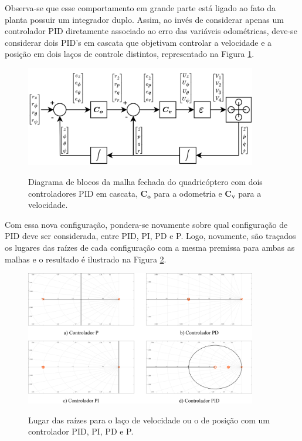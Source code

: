 \documentclass[main.tex]{subfiles}
\begin{document}
Observa-se que esse comportamento em grande parte está ligado ao fato da planta possuir um integrador duplo. Assim, ao invés de considerar apenas um controlador PID diretamente associado ao erro das variáveis odométricas, deve-se considerar dois PID's em cascata que objetivam controlar a velocidade e a posição em dois laços de controle distintos, representado na Figura \ref{fig:controlador_cascata_pid}. 

\begin{figure}[!h]
	\centering
	\caption{Diagrama de blocos da malha fechada do quadricóptero com dois controladores PID em cascata, $\boldsymbol{C_o}$ para a odometria e $\boldsymbol{C_v}$ para a velocidade.}
	\includegraphics[width=0.9\textwidth]{capitulos/controle_atitude/imgs/controlador_cascata_pid.png}
	\label{fig:controlador_cascata_pid}
\end{figure}

Com essa nova configuração, pondera-se novamente sobre qual configuração de PID deve ser considerada, entre PID, PI, PD e P. Logo, novamente, são traçados os lugares das raízes de cada configuração com a mesma premissa para ambas as malhas e o resultado é ilustrado na Figura \ref{fig:lugar_raizes_bom}.

\begin{figure}[!h]
	\centering
	\caption{Lugar das raízes para o laço de velocidade ou o de posição com um controlador PID, PI, PD e P.}
	\includegraphics[width=0.9\textwidth]{capitulos/controle_atitude/imgs/lugar_raizes_bom.png}
	\label{fig:lugar_raizes_bom}
\end{figure}
\end{document}
